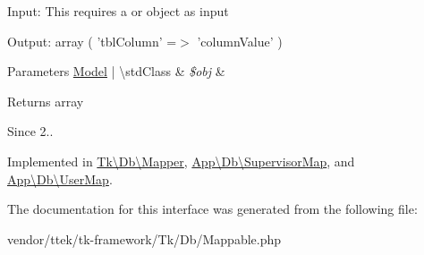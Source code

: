 Input\+: This requires a  or  object as input

Output\+: array ( 'tbl\+Column' =$>$ 'column\+Value' )


\begin{DoxyParams}[1]{Parameters}
\hyperlink{classTk_1_1Db_1_1Model}{Model} | \textbackslash{}std\+Class & {\em \$obj} & \\
\hline
\end{DoxyParams}
\begin{DoxyReturn}{Returns}
array 
\end{DoxyReturn}
\begin{DoxySince}{Since}
2.. 
\end{DoxySince}


Implemented in \hyperlink{classTk_1_1Db_1_1Mapper_a42a9e4d6c1eb19c9cc8c20f2787d90e2}{Tk\textbackslash{}\+Db\textbackslash{}\+Mapper}, \hyperlink{classApp_1_1Db_1_1SupervisorMap_a4ff3ad6ce5f2da3236ca6e6e6df6dbc6}{App\textbackslash{}\+Db\textbackslash{}\+Supervisor\+Map}, and \hyperlink{classApp_1_1Db_1_1UserMap_a581307e8d72d0af72967e4dcd135ec6c}{App\textbackslash{}\+Db\textbackslash{}\+User\+Map}.



The documentation for this interface was generated from the following file\+:\begin{DoxyCompactItemize}
\item 
vendor/ttek/tk-\/framework/\+Tk/\+Db/Mappable.\+php\end{DoxyCompactItemize}
